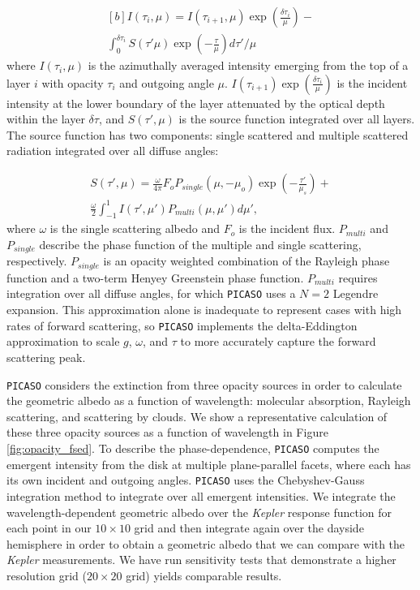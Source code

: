 \documentclass[twocolumn]{aastex63}
\begin{document}
\begin{equation}
    \begin{gathered}[b]
    I(\tau_i,\mu) = I(\tau_{i+1},\mu) \exp(\frac{\delta \tau_i}{\mu}) - \\ 
    \int_{0}^{\delta \tau_i} S(\tau' \mu) \exp(-\frac{\tau}{\mu}) d\tau'/\mu
    \end{gathered}
    \label{eq:rt1}
\end{equation}
where $I(\tau_i,\mu)$ is the azimuthally averaged intensity emerging from the top of a layer $i$ with opacity $\tau_i$ and outgoing angle $\mu$.  $I(\tau_{i+1})\exp(\frac{\delta \tau_i}{\mu})$ is the incident intensity at the lower boundary of the layer attenuated by the optical depth within the layer $\delta \tau$, and $S(\tau',\mu)$ is the source function integrated over all layers.  The source function has two components: single scattered and multiple scattered radiation integrated over all diffuse angles: 

\begin{equation} 
    \begin{gathered}
    S(\tau',\mu) = \frac{\omega}{4\pi}F_o P_{single} (\mu, -\mu_o) \exp(-\frac{\tau'}{\mu_s}) + \\ 
    \frac{\omega}{2} \int_{-1}^{1}I(\tau',\mu')P_{multi}(\mu,\mu')d\mu',
    \end{gathered}
    \label{eq:rt2}
\end{equation}
where $\omega$ is the single scattering albedo and $F_o$ is the incident flux. $P_{multi}$ and $P_{single}$ describe the phase function of the multiple and single scattering, respectively. $P_{single}$ is an opacity weighted combination of the Rayleigh phase function and a two-term Henyey Greenstein phase function. $P_{multi}$ requires integration over all diffuse angles, for which \texttt{PICASO} uses a $N=2$ Legendre expansion. This approximation alone is inadequate to represent cases with high rates of forward scattering, so \texttt{PICASO} implements the delta-Eddington approximation to scale $g$, $\omega$, and $\tau$ to more accurately capture the forward scattering peak.

\texttt{PICASO} considers the extinction from three opacity sources in order to calculate the geometric albedo as a function of wavelength: molecular absorption, Rayleigh scattering, and scattering by clouds. We show a representative calculation of these three opacity sources as a function of wavelength in Figure \ref{fig:opacity_fsed}.  To describe the phase-dependence, \texttt{PICASO} computes the emergent intensity from the disk at multiple plane-parallel facets, where each has its own incident and outgoing angles. \texttt{PICASO} uses the Chebyshev-Gauss integration method to integrate over all emergent intensities.  We integrate the wavelength-dependent geometric albedo over the \emph{Kepler} response function for each point in our $10\times10$ grid and then integrate again over the dayside hemisphere in order to obtain a geometric albedo that we can compare with the \emph{Kepler} measurements. We have run sensitivity tests that demonstrate a higher resolution grid ($20\times20$ grid) yields comparable results. 
\end{document}

